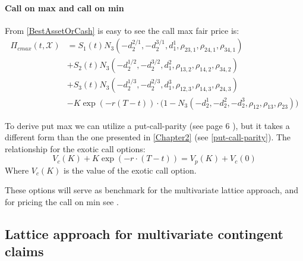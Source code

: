 \paragraph{Call on max and call on min}
From \eqref{BestAssetOrCash} is easy to see the call max fair price is:
\begin{equation}\label{callMax}
\begin{split}
\Pi_{cmax}(t,\mathcal{X})&=S_1(t) N_3(-d_2^{2/1},-d_2^{3/1},d_1^{1}, \rho_{23,1}, \rho_{24,1}, \rho_{34,1}) \\
&+S_2(t) N_3(-d_2^{1/2},-d_2^{3/2},d_1^{2}, \rho_{13,2}, \rho_{14,2}, \rho_{34,2})\\
&+S_3(t) N_3(-d_2^{1/3},-d_2^{2/3},d_1^{3}, \rho_{12,3}, \rho_{14,3}, \rho_{24,3}) \\
&-K \exp(-r(T-t)) \cdot\bigg(1 - N_3(-d_2^1,-d_2^2,-d_2^3, \rho_{12}, \rho_{13}, \rho_{23})\bigg)
\end{split}
\end{equation}

To derive put max we can utilize a put-call-parity (see page 6 \parencite{Ouwehand2006}), but it takes a different form than the one presented in \ref{Chapter2} (see \ref{put-call-parity}). The relationship for the exotic call options:
$$V_c(K)+K\exp(-r\cdot (T-t)) = V_p(K)+V_c(0)$$
Where $V_c(K)$ is the value of the exotic call option.

These options will serve as benchmark for the multivariate lattice approach, and for pricing the call on min see \parencite{Ouwehand2006}.


\subsection{Lattice approach for multivariate contingent claims}
